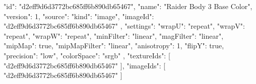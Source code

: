 {
  "id": "d2eff9d6d3772bc685ff6b890db65467",
  "name": "Raider Body 3 Base Color",
  "version": 1,
  "source": {
    "kind": "image",
    "imageId": "d2eff9d6d3772bc685ff6b890db65467"
  },
  "settings": {
    "wrapU": "repeat",
    "wrapV": "repeat",
    "wrapW": "repeat",
    "minFilter": "linear",
    "magFilter": "linear",
    "mipMap": true,
    "mipMapFilter": "linear",
    "anisotropy": 1,
    "flipY": true,
    "precision": "low",
    "colorSpace": "srgb"
  },
  "textureIds": [
    "d2eff9d6d3772bc685ff6b890db65467"
  ],
  "imageIds": [
    "d2eff9d6d3772bc685ff6b890db65467"
  ]
}
